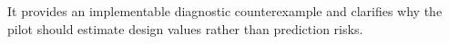 It provides an implementable diagnostic counterexample and clarifies why the pilot should estimate design values rather than prediction risks.